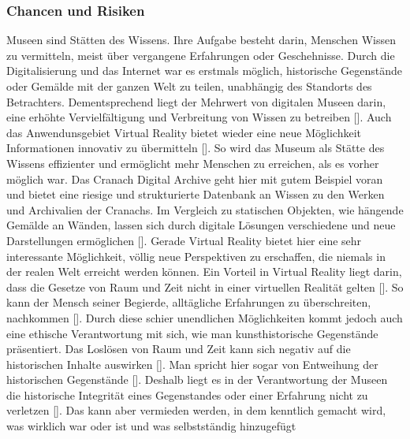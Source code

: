 \documentclass[a4paper,12pt,oneside]{article}
\begin{document}
      \subsubsection{Chancen und Risiken}
        Museen sind Stätten des Wissens. Ihre Aufgabe besteht darin, Menschen Wissen zu
        vermitteln, meist über vergangene Erfahrungen oder Geschehnisse. Durch die
        Digitalisierung und das Internet war es erstmals möglich, historische Gegenstände
        oder Gemälde mit der ganzen Welt zu teilen, unabhängig des Standorts des 
        Betrachters. Dementsprechend liegt der Mehrwert von digitalen Museen darin, eine
        erhöhte Vervielfältigung und Verbreitung von Wissen zu betreiben [\cite[17]{Huennekens2002}].
        Auch das Anwendunsgebiet Virtual Reality bietet wieder eine neue Möglichkeit
        Informationen innovativ zu übermitteln [\cite[52]{Heidsiek2019}].
        So wird das Museum als Stätte des Wissens effizienter und ermöglicht mehr Menschen
        zu erreichen, als es vorher möglich war. Das Cranach Digital Archive geht hier mit
        gutem Beispiel voran und bietet eine riesige und strukturierte Datenbank an Wissen
        zu den Werken und Archivalien der Cranachs.
        Im Vergleich zu statischen Objekten, wie hängende Gemälde an Wänden, lassen sich 
        durch digitale Lösungen verschiedene und neue Darstellungen ermöglichen [\cite[17]{Huennekens2002}].
        Gerade Virtual Reality bietet hier eine sehr interessante Möglichkeit, völlig neue
        Perspektiven zu erschaffen, die niemals in der realen Welt erreicht werden können.
        Ein Vorteil in Virtual Reality liegt darin, dass die Gesetze von Raum und Zeit nicht
        in einer virtuellen Realität gelten [\cite[140]{Huennekens2002}]. So kann der Mensch
        seiner Begierde, alltägliche Erfahrungen zu überschreiten, nachkommen [\cite[140]{Huennekens2002}].
        Durch diese schier unendlichen Möglichkeiten kommt jedoch auch eine ethische 
        Verantwortung mit sich, wie man kunsthistorische Gegenstände präsentiert.
        Das Loslösen von Raum und Zeit kann sich negativ auf die historischen Inhalte auswirken
        [\cite[141]{Huennekens2002}]. Man spricht hier sogar von Entweihung der historischen
        Gegenstände [\cite[141]{Huennekens2002}]. Deshalb liegt es in der Verantwortung der
        Museen die historische Integrität eines Gegenstandes oder einer Erfahrung nicht
        zu verletzen [\cite[38]{Heidsiek2019}]. Das kann aber vermieden werden, in dem 
        kenntlich gemacht wird, was wirklich war oder ist und was selbstständig hinzugefügt
\end{document}

